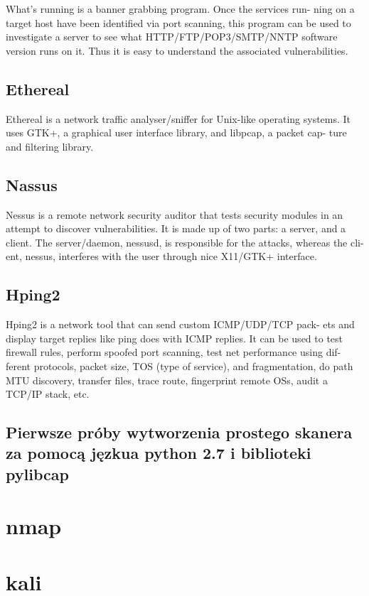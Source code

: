 What's running is a banner grabbing program. Once the services run-
ning on a target host have been identified via port scanning, this program can be
used to investigate a server to see what HTTP/FTP/POP3/SMTP/NNTP software
version runs on it. Thus it is easy to understand the associated vulnerabilities.




\subsection{Ethereal}

Ethereal is a network traffic analyser/sniffer for Unix-like operating
systems. It uses GTK+, a graphical user interface library, and libpcap, a packet cap-
ture and filtering library.

\subsection{Nassus}

Nessus is a remote network security auditor that tests security modules
in an attempt to discover vulnerabilities. It is made up of two parts: a server, and a
client. The server/daemon, nessusd, is responsible for the attacks, whereas the cli-
ent, nessus, interferes with the user through nice X11/GTK+ interface.

\subsection{Hping2}

Hping2 is a network tool that can send custom ICMP/UDP/TCP pack-
ets and display target replies like ping does with ICMP replies. It can be used to
test firewall rules, perform spoofed port scanning, test net performance using dif-
ferent protocols, packet size, TOS (type of service), and fragmentation, do path
MTU discovery, transfer files, trace route, fingerprint remote OSs, audit a TCP/IP
stack, etc.


\subsection{Pierwsze próby wytworzenia prostego skanera za pomocą jęzkua python 2.7 i biblioteki pylibcap}

\section{nmap}

\section{kali}




